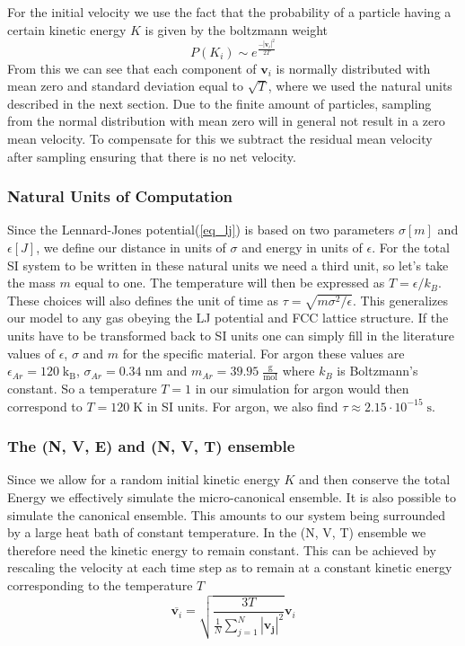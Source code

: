 \documentclass[twoside]{article}
\newcommand{\unit}[1]{\ensuremath{\; \mathrm{#1}}}
\begin{document}
For the initial velocity we use the fact that the probability of a particle having a certain kinetic energy $K$ is given by the boltzmann weight 
\begin{equation}\label{eq_boltzmann}
P(K_i) \sim e^{\frac{-|\mathbf{v}_i|^2}{2T}}
\end{equation}
From this we can see that each component of $\mathbf{v}_i$ is normally distributed with mean zero and standard deviation equal to $\sqrt{T}$, where we used the natural units described in the next section. Due to the finite amount of particles, sampling from the normal distribution with mean zero will in general not result in a zero mean velocity. To compensate for this we subtract the residual mean velocity after sampling ensuring that there is no net velocity.  


\subsubsection*{Natural Units of Computation}
Since the Lennard-Jones potential(\eqref{eq_lj}) is based on two parameters $\sigma [m]$ and $\epsilon [J]$, we define our distance in units of $\sigma$ and energy in units of $\epsilon$. For the total SI system to be written in these natural units we need a third unit, so let's take the mass $m$ equal to one. The temperature will then be expressed as $T  = \epsilon/k_B$. These choices will also defines the unit of time as $\tau = \sqrt{m\sigma^2/\epsilon}$. This generalizes our model to any gas obeying the LJ potential and FCC lattice structure. If the units have to be transformed back to SI units one can simply fill in the literature values of $\epsilon$, $\sigma$ and $m$ for the specific material. For argon these values are $\epsilon_{Ar} = 120 \unit{k_B}$, $\sigma_{Ar} = 0.34 \unit{nm}$ and $m_{Ar} = 39.95 \unit{\frac{g}{mol}}$ where $k_B$ is Boltzmann's constant. So a temperature $T = 1$ in our simulation for argon would then correspond to $T = 120 \unit{K}$ in SI units. For argon, we also find $\tau \approx 2.15 \cdot 10^{-15} \unit{s}$.

\subsubsection*{The (N, V, E) and (N, V, T) ensemble}
Since we allow for a random initial kinetic energy $K$ and then conserve the total Energy we effectively simulate the micro-canonical ensemble. It is also possible to simulate the canonical ensemble. This amounts to our system being surrounded by a large heat bath of constant temperature. In the (N, V, T) ensemble we therefore need the kinetic energy to remain constant. This can be achieved by rescaling the velocity at each time step as to remain at a constant kinetic energy corresponding to the temperature $T$
\begin{equation}\label{eq_vel_rescale}
\overline{\mathbf{v}_i} = \sqrt{\frac{3 T}{\frac{1}{N} \sum_{j=1}^N |\mathbf{v_j}|^2}} \mathbf{v}_i
\end{equation}
\end{document}
